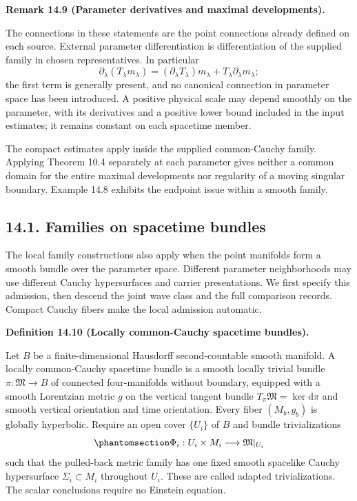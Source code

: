 \documentclass[
  english,
  11pt,
  reqno]{amsart}
\makeatletter
\newcommand{\pandocstatementheading}[1]{%
  \par\if@nobreak\else
    \addpenalty{\@beginparpenalty}%
    \addvspace{.5\baselineskip plus .2\baselineskip minus .2\baselineskip}%
  \fi
  {\normalfont\bfseries #1\par}%
  \nobreak\@afterindenttrue\@afterheading
}
\makeatother
\begin{document}
\pandocstatementheading{\protect{}\label{rem:parameter-family-scope}Remark 14.9 (Parameter derivatives and maximal developments).}

The connections in these statements are the point connections already
defined on each source. External parameter differentiation is
differentiation of the supplied family in chosen representatives. In
particular \[
\partial_\lambda(T_\lambda m_\lambda)
=(\partial_\lambda T_\lambda)m_\lambda
 +T_\lambda\partial_\lambda m_\lambda;
\] the first term is generally present, and no canonical connection in
parameter space has been introduced. A positive physical scale may
depend smoothly on the parameter, with its derivatives and a positive
lower bound included in the input estimates; it remains constant on each
spacetime member.

The compact estimates apply inside the supplied common-Cauchy family.
Applying Theorem 10.4 separately at each parameter gives neither a
common domain for the entire maximal developments nor regularity of a
moving singular boundary. Example 14.8 exhibits the endpoint issue
within a smooth family.

\protect{}\label{sec:intrinsic-spacetime-families}

\subsection{14.1. Families on spacetime
bundles}\label{families-on-spacetime-bundles}

The local family constructions also apply when the point manifolds form
a smooth bundle over the parameter space. Different parameter
neighborhoods may use different Cauchy hypersurfaces and carrier
presentations. We first specify this admission, then descend the joint
wave class and the full comparison records. Compact Cauchy fibers make
the local admission automatic.

\pandocstatementheading{\protect{}\label{def:locally-common-cauchy-bundles}Definition 14.10 (Locally common-Cauchy spacetime bundles).}

Let \(B\) be a finite-dimensional Hausdorff second-countable smooth
manifold. A locally common-Cauchy spacetime bundle is a smooth locally
trivial bundle \(\pi:\mathfrak M\to B\) of connected four-manifolds
without boundary, equipped with a smooth Lorentzian metric \(g\) on the
vertical tangent bundle \(T_\pi\mathfrak M=\ker\mathrm d\pi\) and smooth
vertical orientation and time orientation. Every fiber \((M_b,g_b)\) is
globally hyperbolic. Require an open cover \(\{U_i\}\) of \(B\) and
bundle trivializations
\begin{equation}\protect\phantomsection\label{eq:intrinsic-family-local-trivializations}{
\Phi_i:U_i\times M_i\longrightarrow\mathfrak M|_{U_i}
}\end{equation} such that the pulled-back metric family has one fixed
smooth spacelike Cauchy hypersurface \(\Sigma_i\subset M_i\) throughout
\(U_i\). These are called adapted trivializations. The scalar
conclusions require no Einstein equation.
\end{document}

